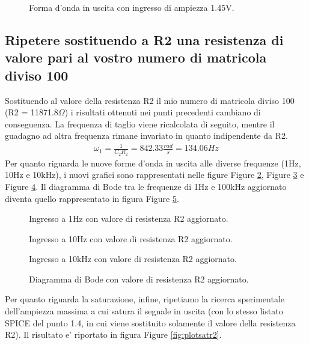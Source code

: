 \documentclass[a4paper,10pt]{article}
\begin{document}
\begin{figure}[h!]
	\centering
  	\caption{Forma d'onda in uscita con ingresso di ampiezza 1.45V.}
  	\label{fig:sat2}
\end{figure}

\subsection{Ripetere sostituendo a R2 una resistenza di valore pari al vostro numero di matricola diviso 100}
Sostituendo al valore della resistenza R2 il mio numero di matricola diviso 100 (R2 = 11871.8$\Omega$) i risultati ottenuti nei punti precedenti cambiano di conseguenza. La frequenza di taglio viene ricalcolata di seguito, mentre il guadagno ad altra frequenza rimane invariato in quanto indipendente da R2.
\begin{align*}
\omega_1 = \frac{1}{C_2R_2} = 842.33 \frac{rad}{s} = 134.06Hz
\end{align*}
Per quanto riguarda le nuove forme d'onda in uscita alle diverse frequenze (1Hz, 10Hz e 10kHz), i nuovi grafici sono rappresentati nelle figure Figure \ref{fig:plot1hzr2}, Figure \ref{fig:plot10hzr2} e Figure \ref{fig:plot10khzr2}. Il diagramma di Bode tra le frequenze di 1Hz e 100kHz aggiornato diventa quello rappresentato in figura Figure \ref{fig:plotboder2}.
\begin{figure}[h!]
	\centering
  	\caption{Ingresso a 1Hz con valore di resistenza R2 aggiornato.}
  	\label{fig:plot1hzr2}
\end{figure}

\begin{figure}[h!]
	\centering
  	\caption{Ingresso a 10Hz con valore di resistenza R2 aggiornato.}
  	\label{fig:plot10hzr2}
\end{figure}

\begin{figure}[h!]
	\centering
  	\caption{Ingresso a 10kHz con valore di resistenza R2 aggiornato.}
  	\label{fig:plot10khzr2}
\end{figure}

\begin{figure}[h!]
	\centering
  	\caption{Diagramma di Bode con valore di resistenza R2 aggiornato.}
  	\label{fig:plotboder2}
\end{figure}

\pagebreak
Per quanto riguarda la saturazione, infine, ripetiamo la ricerca sperimentale dell'ampiezza massima a cui satura il segnale in uscita (con lo stesso listato SPICE del punto 1.4, in cui viene sostituito solamente il valore della resistenza R2). Il risultato e' riportato in figura Figure \ref{fig:plotsatr2}.
\end{document}
